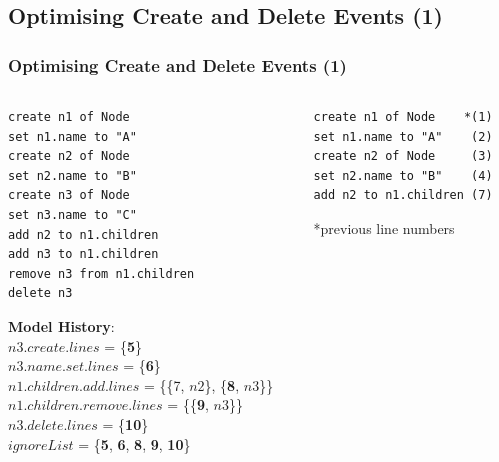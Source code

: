\documentclass{beamer}
\begin{document}
\begin{frame}[fragile]
\section{Optimising Create and Delete Events (1)}
\frametitle{Optimising Create and Delete Events (1)}

\begin{columns}
\begin{column}[t]{0.5\linewidth}
\begin{lstlisting}[style=eol,caption={A tree model persisted in change-based.},label=lst:cbpmodel]
create n1 of Node
set n1.name to "A"  
create n2 of Node
set n2.name to "B"  
create n3 of Node
set n3.name to "C"  
add n2 to n1.children   
add n3 to n1.children
remove n3 from n1.children   
delete n3
\end{lstlisting}

\begin{footnotesize}
\textbf{Model History}:\\
$n3$.$create$.$lines$ = \{\textbf{5}\}\\ 
$n3$.$name$.$set$.$lines$ = \{\textbf{6}\}\\
$n1$.$children$.$add$.$lines$ = \{\{7, $n2$\}, \{\textbf{8}, $n3$\}\}\\
$n1$.$children$.$remove$.$lines$ = \{\{\textbf{9}, $n3$\}\}\\
$n3$.$delete$.$lines$ = \{\textbf{10}\}\\
$ignoreList$ = \{\textbf{5}, \textbf{6}, \textbf{8}, \textbf{9}, \textbf{10}\}
\end{footnotesize}

\end{column}

\begin{column}[t]{0.5\linewidth}
\begin{lstlisting}[style=eol,caption={A replay of the CBP in Listing 9 after optimisation.},label=lst:cbpmodel_optimised]
create n1 of Node    *(1)
set n1.name to "A"    (2)
create n2 of Node     (3)
set n2.name to "B"    (4)
add n2 to n1.children (7)
\end{lstlisting}
*previous line numbers\\
\end{column}
\end{columns}

\end{frame}
\end{document}
